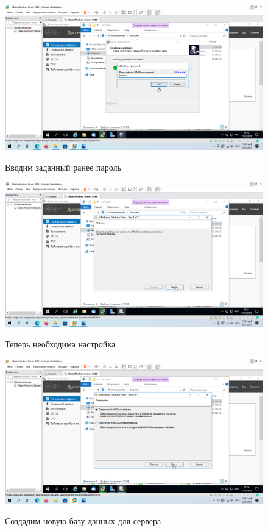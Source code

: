 \documentclass[a4paper]{article}
\begin{document}
  \begin{figure}[H]
    \centering
    \includegraphics[width=\textwidth]{11_0055}
    \label{img:55}
    \caption{Вводим заданный ранее пароль}
  \end{figure}

  \begin{figure}[H]
    \centering
    \includegraphics[width=\textwidth]{11_0056}
    \label{img:56}
    \caption{Теперь необходима настройка}
  \end{figure}

  \begin{figure}[H]
    \centering
    \includegraphics[width=\textwidth]{11_0057}
    \label{img:57}
    \caption{Создадим новую базу данных для сервера}
  \end{figure}
\end{document}
